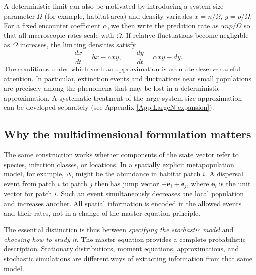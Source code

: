 A deterministic limit can also be motivated by introducing a system-size
parameter $\Omega$ (for example, habitat area) and density variables
$x=n/\Omega$, $y=p/\Omega$. For a fixed encounter coefficient $\alpha$,
we then write the predation rate as $\alpha np/\Omega$ so that all
macroscopic rates scale with $\Omega$. If relative fluctuations become
negligible as $\Omega$ increases, the limiting densities satisfy
\begin{equation}
 \frac{dx}{dt}=bx-\alpha xy,\qquad
 \frac{dy}{dt}=\alpha xy-dy.
 \label{eq:multi-deterministic-limit}
\end{equation}
The conditions under which such an approximation is accurate deserve
careful attention. In particular, extinction events and fluctuations near
small populations are precisely among the phenomena that may be lost in a
deterministic approximation. A systematic treatment of the
large-system-size approximation can be developed separately (see Appendix \ref{App:LargeN-expansion}).

\subsection{Why the multidimensional formulation matters}
\label{subsec:multi-why}

The same construction works whether components of the state vector refer to
species, infection classes, or locations. In a spatially explicit
metapopulation model, for example, $N_i$ might be the abundance in habitat
patch $i$. A dispersal event from patch $i$ to patch $j$ then has jump
vector $-\mathbf e_i+\mathbf e_j$, where $\mathbf e_i$ is the unit vector
for patch $i$. Such an event simultaneously decreases one local population
and increases another. All spatial information is encoded in the allowed
events and their rates, not in a change of the master-equation principle.

The essential distinction is thus between \emph{specifying the stochastic
model} and \emph{choosing how to study it}. The master equation provides a
complete probabilistic description. Stationary distributions, moment
equations, approximations, and stochastic simulations are different ways of
extracting information from that same model.

